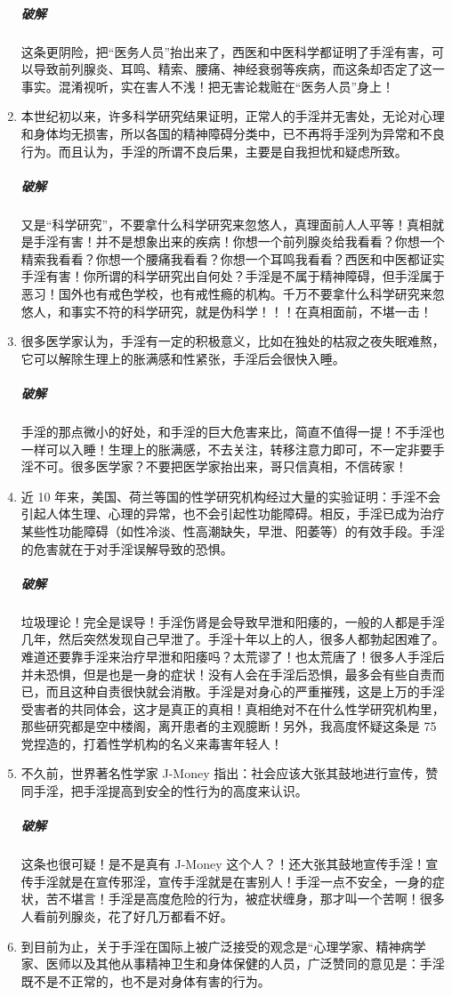 \documentclass{ctexart}
\begin{document}
\begin{enumerate}
    \subparagraph{破解} 这条更阴险，把“医务人员”抬出来了，西医和中医科学都证明了手淫有害，可以导致前列腺炎、耳鸣、精索、腰痛、神经衰弱等疾病，而这条却否定了这一事实。混淆视听，实在害人不浅！把无害论栽赃在“医务人员”身上！
    \item 本世纪初以来，许多科学研究结果证明，正常人的手淫并无害处，无论对心理和身体均无损害，所以各国的精神障碍分类中，已不再将手淫列为异常和不良行为。而且认为，手淫的所谓不良后果，主要是自我担忧和疑虑所致。
    \subparagraph{破解} 又是“科学研究”，不要拿什么科学研究来忽悠人，真理面前人人平等！真相就是手淫有害！并不是想象出来的疾病！你想一个前列腺炎给我看看？你想一个精索我看看？你想一个腰痛我看看？你想一个耳鸣我看看？西医和中医都证实手淫有害！你所谓的科学研究出自何处？手淫是不属于精神障碍，但手淫属于恶习！国外也有戒色学校，也有戒性瘾的机构。千万不要拿什么科学研究来忽悠人，和事实不符的科学研究，就是伪科学！！！在真相面前，不堪一击！
    \item 很多医学家认为，手淫有一定的积极意义，比如在独处的枯寂之夜失眠难熬，它可以解除生理上的胀满感和性紧张，手淫后会很快入睡。
    \subparagraph{破解} 手淫的那点微小的好处，和手淫的巨大危害来比，简直不值得一提！不手淫也一样可以入睡！生理上的胀满感，不去关注，转移注意力即可，不一定非要手淫不可。很多医学家？不要把医学家抬出来，哥只信真相，不信砖家！
    \item 近 10 年来，美国、荷兰等国的性学研究机构经过大量的实验证明：手淫不会引起人体生理、心理的异常，也不会引起性功能障碍。相反，手淫已成为治疗某些性功能障碍（如性冷淡、性高潮缺失，早泄、阳萎等）的有效手段。手淫的危害就在于对手淫误解导致的恐惧。
    \subparagraph{破解} 垃圾理论！完全是误导！手淫伤肾是会导致早泄和阳痿的，一般的人都是手淫几年，然后突然发现自己早泄了。手淫十年以上的人，很多人都勃起困难了。难道还要靠手淫来治疗早泄和阳痿吗？太荒谬了！也太荒唐了！很多人手淫后并未恐惧，但是也是一身的症状！没有人会在手淫后恐惧，最多会有些自责而已，而且这种自责很快就会消散。手淫是对身心的严重摧残，这是上万的手淫受害者的共同体会，这才是真正的真相！真相绝对不在什么性学研究机构里，那些研究都是空中楼阁，离开患者的主观臆断！另外，我高度怀疑这条是 75 党捏造的，打着性学机构的名义来毒害年轻人！
    \item 不久前，世界著名性学家 J-Money 指出：社会应该大张其鼓地进行宣传，赞同手淫，把手淫提高到安全的性行为的高度来认识。
    \subparagraph{破解} 这条也很可疑！是不是真有 J-Money 这个人？！还大张其鼓地宣传手淫！宣传手淫就是在宣传邪淫，宣传手淫就是在害别人！手淫一点不安全，一身的症状，苦不堪言！手淫是高度危险的行为，被症状缠身，那才叫一个苦啊！很多人看前列腺炎，花了好几万都看不好。
    \item 到目前为止，关于手淫在国际上被广泛接受的观念是“心理学家、精神病学家、医师以及其他从事精神卫生和身体保健的人员，广泛赞同的意见是：手淫既不是不正常的，也不是对身体有害的行为。

\end{enumerate}
\end{document}
